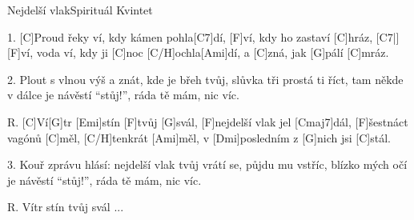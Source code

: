 \begin{song}{Nejdelší vlak}{Spirituál Kvintet}

\begin{xverse}{1. }
[C]Proud řeky ví, kdy kámen pohla[C7]dí,
[F]ví, kdy ho zastaví [C]hráz, [C7|]{}
[F]ví, voda ví, kdy ji [C]noc [C/H]ochla[Ami]dí,
a [C]zná, jak [G]pálí [C]mráz.
\end{xverse}


\begin{xverse}{2. }
Plout s vlnou výš a znát, kde je břeh tvůj,
slůvka tři prostá ti říct,
tam někde v dálce je návěstí ``stůj!'',
ráda tě mám, nic víc.
\end{xverse}


\begin{xverse}{R. }
[C]Ví[G]tr [Emi]stín [F]tvůj [G]svál,
[F]nejdelší vlak jel [Cmaj7]dál,
[F]{šest}náct vagónů [C]měl, [C/H]tenkrát [Ami]měl,
v [Dmi]posledním z [G]nich jsi [C]stál.
\end{xverse}


\begin{xverse}{3. }
Kouř zprávu hlásí: nejdelší vlak tvůj
vrátí se, půjdu mu vstříc,
blízko mých očí je návěstí ``stůj!'',
ráda tě mám, nic víc.
\end{xverse}


\begin{xverse}{R. }
Vítr stín tvůj svál ...
\end{xverse}

\end{song}
\chords{\chordCmajSeven \chordCH}

